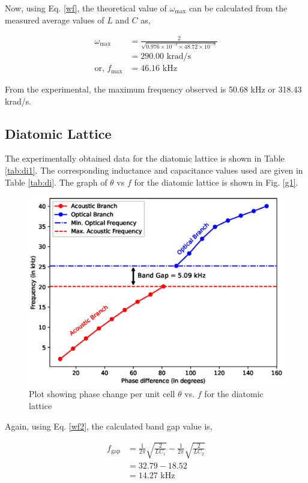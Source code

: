 Now, using Eq. \ref{wf}, the theoretical value of $\omega_\text{max}$ can be calculated from the measured average values of $L$ and $C$ as,

\begin{align*}
    \omega_\text{max} &= \frac{2}{\sqrt{0.976 \times 10^{-3} \times 48.72 \times 10^{-9}}}\\ &= 290.00 \text{ krad/s}\\ \text{or, }f_\text{max} &= 46.16 \text{ kHz}
\end{align*}

From the experimental, the maximum frequency observed is 50.68 kHz or 318.43 krad/s.

\subsection{Diatomic Lattice}
The experimentally obtained data for the diatomic
lattice is shown in Table \ref{tab:di1}. The corresponding inductance and capacitance values used are given in Table \ref{tab:di}. The graph of $\theta$ vs $f$ for the diatomic lattice is shown in Fig. \ref{g1}.



\begin{figure}
    \centering
    \includegraphics[width=1\columnwidth]{images/di.eps}
    \caption{Plot showing phase change per unit cell $\theta$ vs. $f$ for the diatomic lattice}
    \label{g2}
\end{figure}

Again, using Eq. \ref{wf2}, the calculated band gap value is,

\begin{align*}
    f_\text{gap} &= \frac{1}{2\pi}\sqrt{\frac{2}{LC_1}} - \frac{1}{2\pi}\sqrt{\frac{2}{LC_2}}\\
    &= 32.79 - 18.52 \\&= 14.27 \text{ kHz}
\end{align*}

